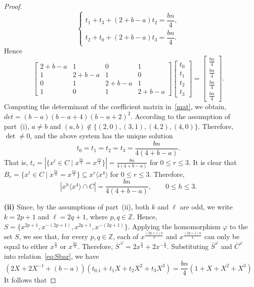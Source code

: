 \documentclass[12pt]{article}
\begin{document}
\begin{proof}
\[\begin{cases}
  	t_1 + t_3 + (2+b-a)t_2 = \dfrac{bn}{4},\\
  	t_2 + t_0 + (2+b-a)t_3 = \dfrac{bn}{4}.
  \end{cases}
  \]
  Hence
  \begin{equation}\label{mat}
  	\begin{bmatrix}
  		2+b-a & 1 & 0 & 1\\
  		1 & 2+b-a & 1 & 0\\
  		0 & 1 & 2+b-a & 1\\
  		1 & 0 & 1 & 2+b-a
  	\end{bmatrix}
  	\begin{bmatrix}
  		t_0\\
  		t_1\\
  		t_2\\
  		t_3
  	\end{bmatrix}
  	=
  	\begin{bmatrix}
  		\frac{bn}{4}\\
  		\frac{bn}{4}\\
  		\frac{bn}{4}\\
  		\frac{bn}{4}
  	\end{bmatrix}.
  \end{equation}
  Computing the determinant of the coefficient matrix in~\eqref{mat}, we obtain,	
  $
  det = (b-a)(b-a+4)(b-a+2)^2.
  $ According to the assumption of part~(i), \(a \neq b\) and
  $(a,b)\notin\{(2,0),(3,1),(4,2),(4,0)\}$. Therefore, \(\det \neq 0\), and the above system has the unique solution
  \[
  t_0=t_1=t_2=t_3=\frac{bn}{4(4+b-a)}.
  \]
  That is, $t_r = \left|\{x^t \in C \mid x^{\frac{tn}{4}} = x^{\frac{rn}{4}}\}\right| = \frac{bn}{4(4+b-a)}$ for $0 \le r \le 3$. It is clear that $B_r = \{x^t \in C \mid x^{\frac{tn}{4}} = x^{\frac{rn}{4}}\} \subseteq x^r \langle x^4 \rangle$ for $0 \le r \le 3$. Therefore,
  \[
  |x^h\langle x^4\rangle \cap C| = \frac{bn}{4(4+b-a)}, \qquad 0 \le h \le 3.
  \]
 \par
 \indent\textbf{(ii)} Since, by the assumptions of part~(ii), both $k$ and $\ell$ are odd, we write $k=2p+1$ and $\ell=2q+1$, where $p,q\in\mathbb{Z}$. Hence, $S=\{x^{2p+1},x^{-(2p+1)},x^{2q+1},x^{-(2q+1)}\}$. Applying the homomorphism $\varphi$ to the set $S$, we see that, for every $p,q\in\mathbb{Z}$, each of $x^{\frac{(2p+1)n}{4}}$ and $x^{\frac{(2q+1)n}{4}}$ can only be equal to either $x^{\frac{n}{4}}$ or $x^{\frac{3n}{4}}$. Therefore, $\overline{S}^{\,\varphi}=2x^{\frac{n}{4}}+2x^{-\frac{n}{4}}$. Substituting \(\bar{S}^{\varphi}\) and $\bar{C}^{\varphi}$ into relation~\eqref{eq:Sbar}, we have
 \[
 (2X + 2X^{-1} + (b-a))(t_0.1 + t_1X + t_2X^2 + t_3X^3)
 =
 \frac{bn}{4}(1 + X + X^2 + X^3)
 \]
It follows that


\end{proof}
\end{document}
